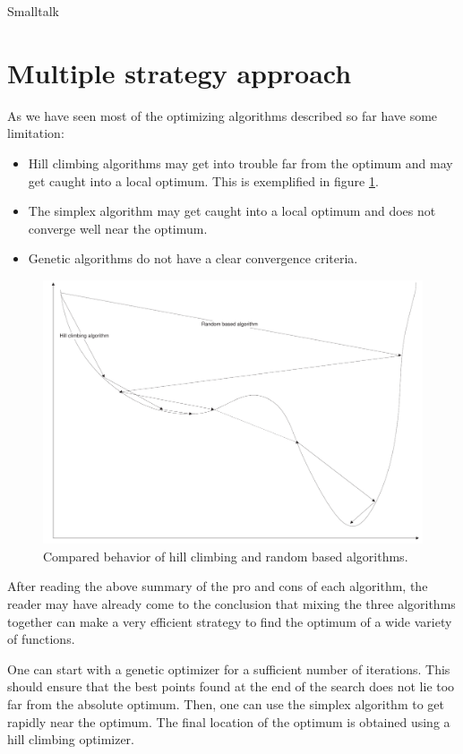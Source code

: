 \begin{displaycode}{Smalltalk}
\section{Multiple strategy approach}
\label{sec:multistrategy} As we have seen most of the optimizing
algorithms described so far have some limitation:
\begin{itemize}
  \item Hill climbing algorithms may get into trouble far from the
  optimum and may get caught into a local optimum. This is exemplified in figure \ref{fig:hillvsrandom}.
  \item The simplex algorithm may get caught into a local optimum
  and does not converge well near the optimum.
  \item Genetic algorithms do not have a clear convergence
  criteria.
\end{itemize}
\begin{figure}
\centering\includegraphics[width=12cm]{Figures/OptimizingComparisonvsd}
\caption{Compared behavior of hill climbing and random based algorithms.}\label{fig:hillvsrandom}
\end{figure}
After reading the above summary of the pro and cons of each
algorithm, the reader may have already come to the conclusion that
mixing the three algorithms together can make a very efficient
strategy to find the optimum of a wide variety of functions.

One can start with a genetic optimizer for a sufficient number of
iterations. This should ensure that the best points found at the
end of the search does not lie too far from the absolute optimum.
Then, one can use the simplex algorithm to get rapidly near the
optimum. The final location of the optimum is obtained using a
hill climbing optimizer.


\end{displaycode}
